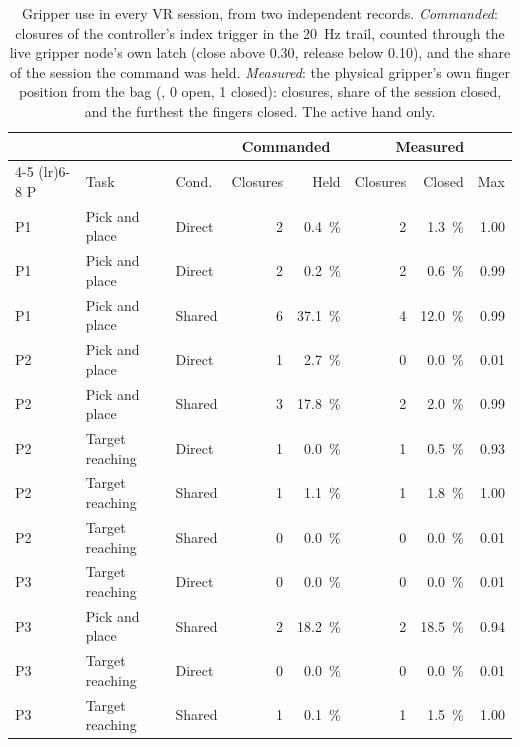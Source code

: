\begin{table}[htbp]
  \centering
  \scriptsize
  \caption[Gripper use in every VR session]{Gripper use in every VR
  session, from two independent records. \emph{Commanded}: closures of the
  controller's index trigger in the \SI{20}{\hertz} trail, counted through
  the live gripper node's own latch (close above 0.30, release below 0.10),
  and the share of the session the command was held. \emph{Measured}: the
  physical gripper's own finger position from the bag
  (, 0 open, 1 closed): closures, share of the
  session closed, and the furthest the fingers closed. The active hand only.}
  \label{tab:gripper-use}
  \begin{tabular}{@{}lllrrrrr@{}}
    \toprule
    & & & \multicolumn{2}{c}{Commanded} & \multicolumn{3}{c}{Measured} \\
    \cmidrule(lr){4-5} \cmidrule(lr){6-8}
    P & Task & Cond. & Closures & Held & Closures & Closed & Max \\
    \midrule
    P1 & Pick and place & Direct & 2 & \SI{0.4}{\percent} & 2 & \SI{1.3}{\percent} & 1.00 \\
    P1 & Pick and place & Direct & 2 & \SI{0.2}{\percent} & 2 & \SI{0.6}{\percent} & 0.99 \\
    P1 & Pick and place & Shared & 6 & \SI{37.1}{\percent} & 4 & \SI{12.0}{\percent} & 0.99 \\
    P2 & Pick and place & Direct & 1 & \SI{2.7}{\percent} & 0 & \SI{0.0}{\percent} & 0.01 \\
    P2 & Pick and place & Shared & 3 & \SI{17.8}{\percent} & 2 & \SI{2.0}{\percent} & 0.99 \\
    P2 & Target reaching & Direct & 1 & \SI{0.0}{\percent} & 1 & \SI{0.5}{\percent} & 0.93 \\
    P2 & Target reaching & Shared & 1 & \SI{1.1}{\percent} & 1 & \SI{1.8}{\percent} & 1.00 \\
    P2 & Target reaching & Shared & 0 & \SI{0.0}{\percent} & 0 & \SI{0.0}{\percent} & 0.01 \\
    P3 & Target reaching & Direct & 0 & \SI{0.0}{\percent} & 0 & \SI{0.0}{\percent} & 0.01 \\
    P3 & Pick and place & Shared & 2 & \SI{18.2}{\percent} & 2 & \SI{18.5}{\percent} & 0.94 \\
    P3 & Target reaching & Direct & 0 & \SI{0.0}{\percent} & 0 & \SI{0.0}{\percent} & 0.01 \\
    P3 & Target reaching & Shared & 1 & \SI{0.1}{\percent} & 1 & \SI{1.5}{\percent} & 1.00 \\

\end{tabular}
\end{table}
